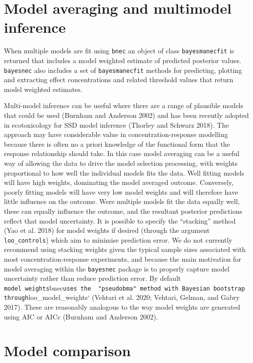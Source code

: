 \documentclass[10pt,a4paper,onecolumn]{article}
\begin{document}
\hypertarget{model-averaging-and-multimodel-inference}{%
\section{Model averaging and multimodel
inference}\label{model-averaging-and-multimodel-inference}}

When multiple models are fit using \texttt{bnec} an object of class
\texttt{bayesmanecfit} is returned that includes a model weighted
estimate of predicted posterior values. \texttt{bayesnec} also includes
a set of \texttt{bayesmanecfit} methods for predicting, plotting and
extracting effect concentrations and related threshold values that
return model weighted estimates.

Multi-model inference can be useful where there are a range of plausible
models that could be used (Burnham and Anderson 2002) and has been
recently adopted in ecotoxicology for SSD model inference (Thorley and
Schwarz 2018). The approach may have considerable value in
concentration-response modelling because there is often no a priori
knowledge of the functional form that the response relationship should
take. In this case model averaging can be a useful way of allowing the
data to drive the model selection processing, with weights proportional
to how well the individual models fits the data. Well fitting models
will have high weights, dominating the model averaged outcome.
Conversely, poorly fitting models will have very low model weights and
will therefore have little influence on the outcome. Were multiple
models fit the data equally well, these can equally influence the
outcome, and the resultant posterior predictions reflect that model
uncertainty. It is possible to specify the ``stacking'' method (Yao et
al. 2018) for model weights if desired (through the argument
\texttt{loo\_controls}) which aim to minimise prediction error. We do
not currently recommend using stacking weights given the typical sample
sizes associated with most concentration-response experiments, and
because the main motivation for model averaging within the
\texttt{bayesnec} package is to properly capture model uncertainty
rather than reduce prediction error. By default
\texttt{model\ weights}bnec\texttt{uses\ the\ \ "pseudobma"\ method\ with\ Bayesian\ bootstrap\ through}loo\_model\_weights`
(Vehtari et al. 2020; Vehtari, Gelman, and Gabry 2017). These are
reasonably analogous to the way model weights are generated using AIC or
AICc (Burnham and Anderson 2002).

\hypertarget{model-comparison}{%
\section{Model comparison}\label{model-comparison}}
\end{document}
